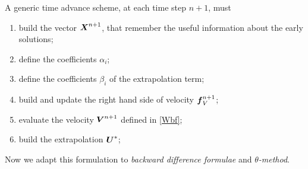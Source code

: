 \documentclass[english,a4paper]{article}
\newcommand{\Xbf}{\text{\mbox{\boldmath $X$}}}
\newcommand{\Ubf}{\text{\mbox{\boldmath $U$}}}
\newcommand{\fbf}{\text{\mbox{\boldmath $f$}}}
\newcommand{\Wbf}{\text{\mbox{\boldmath $V$}}}
\begin{document}
A generic time advance scheme, at each time step $n+1$, must
\begin{enumerate}
\item build the vector $\Xbf^{n+1}$, that remember the useful information about the early solutions;
\item define the coefficients $\alpha_i$;
\item define the coefficients $\beta_i$ of the extrapolation term;
\item build and update the right hand side of velocity $\fbf_V^{n+1}$;
\item evaluate the velocity $\Wbf^{n+1}$ defined in \eqref{Wbf};
\item build the extrapolation $\Ubf^*$;
\end{enumerate}
Now we adapt this formulation to {\sl backward difference formulae}
and $\theta${\sl-method}.
\end{document}
